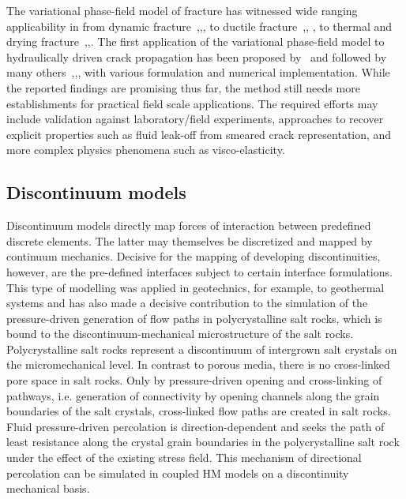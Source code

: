 The variational phase-field model of fracture has witnessed wide ranging applicability in from dynamic fracture~\cite{Bourdin2011},\cite{Borden2012},\cite{Li2016}, to ductile fracture~\cite{Ambati2015},\cite{Miehe2015486}, \cite{Alessi2017}, to thermal and drying fracture~\cite{Maurini2013},\cite{Bourdin2014},\cite{Miehe2015_thermo}. 
The first application of the variational phase-field model to hydraulically driven crack propagation has been proposed by~\cite{Bourdin2012} and followed by many others~\cite{Wheeler2014},\cite{Wilson2016},\cite{Heider201738},\cite{Santillan2017} with various formulation and numerical implementation. 
While the reported findings are promising thus far, the method still needs more establishments for practical field scale applications. 
The required efforts may include validation against laboratory/field experiments, approaches to recover explicit properties such as fluid leak-off from smeared crack representation, and more complex physics phenomena such as visco-elasticity.

\subsection{Discontinuum models}

Discontinuum models directly map forces of interaction between predefined discrete elements. The latter may themselves be discretized and mapped by continuum mechanics. Decisive for the mapping of developing discontinuities, however, are the pre-defined interfaces subject to certain interface formulations. This type of modelling was applied in geotechnics, for example, to geothermal systems \cite{Zeeb2015264} and has also made a decisive contribution to the simulation of the pressure-driven generation of flow paths in polycrystalline salt rocks, which is bound to the discontinuum-mechanical microstructure of the salt rocks. Polycrystalline salt rocks represent a discontinuum of intergrown salt crystals on the micromechanical level. In contrast to porous media, there is no cross-linked pore space in salt rocks. Only by pressure-driven opening and cross-linking of pathways, i.e. generation of connectivity by opening channels along the grain boundaries of the salt crystals, cross-linked flow paths are created in salt rocks. Fluid pressure-driven percolation is direction-dependent and seeks the path of least resistance along the crystal grain boundaries in the polycrystalline salt rock under the effect of the existing stress field. This mechanism of directional percolation can be simulated in coupled HM models on a discontinuity mechanical basis.

